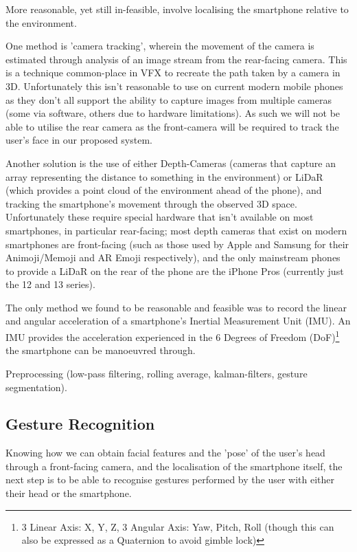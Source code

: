 More reasonable, yet still in-feasible, involve localising the smartphone relative to the environment.

One method is 'camera tracking', wherein the movement of the camera is estimated through analysis of an image stream from the rear-facing camera\cite{jiang2000camera}. This is a technique common-place in VFX to recreate the path taken by a camera in 3D.
Unfortunately this isn't reasonable to use on current modern mobile phones as they don't all support the ability to capture images from multiple cameras (some via software, others due to hardware limitations). As such we will not be able to utilise the rear camera as the front-camera will be required to track the user's face in our proposed system.

Another solution is the use of either Depth-Cameras (cameras that capture an array representing the distance to something in the environment) or LiDaR (which provides a point cloud of the environment ahead of the phone), and tracking the smartphone's movement through the observed 3D space.
Unfortunately these require special hardware that isn't available on most smartphones, in particular rear-facing; most depth cameras that exist on modern smartphones are front-facing (such as those used by Apple and Samsung for their Animoji/Memoji and AR Emoji respectively), and the only mainstream phones to provide a LiDaR on the rear of the phone are the iPhone Pros (currently just the 12 and 13 series).

The only method we found to be reasonable and feasible was to record the linear and angular acceleration of a smartphone's Inertial Measurement Unit (IMU)\cite{mantyla2000hand, kratz2013combining, neelasagar2015real, garcia2014contextualized}. 
An IMU provides the acceleration experienced in the 6 Degrees of Freedom (DoF)\footnote{3 Linear Axis: X, Y, Z, 3 Angular Axis: Yaw, Pitch, Roll (though this can also be expressed as a Quaternion to avoid gimble lock)} the smartphone can be manoeuvred through.

Preprocessing (low-pass filtering, rolling average, kalman-filters, gesture segmentation).

\subsection{Gesture Recognition}
Knowing how we can obtain facial features and the 'pose' of the user's head through a front-facing camera, and the localisation of the smartphone itself, the next step is to be able to recognise gestures performed by the user with either their head or the smartphone.

